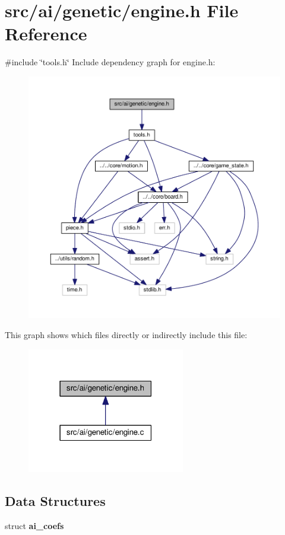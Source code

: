 \section{src/ai/genetic/engine.h File Reference}
\label{engine_8h}
{\ttfamily \#include \char`\"{}tools.\+h\char`\"{}}\newline
Include dependency graph for engine.\+h\+:
\nopagebreak
\begin{figure}[H]
\begin{center}
\leavevmode
\includegraphics[width=350pt]{engine_8h__incl}
\end{center}
\end{figure}
This graph shows which files directly or indirectly include this file\+:
\nopagebreak
\begin{figure}[H]
\begin{center}
\leavevmode
\includegraphics[width=195pt]{engine_8h__dep__incl}
\end{center}
\end{figure}
\subsection*{Data Structures}
\begin{DoxyCompactItemize}
\item 
struct \textbf{ ai\+\_\+coefs}
\end{DoxyCompactItemize}
